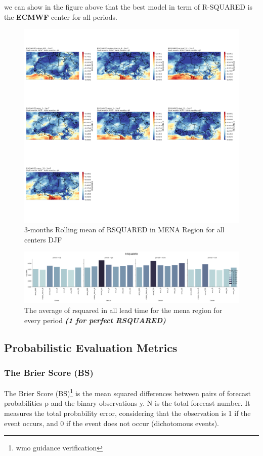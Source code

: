 we can show in the figure above that the best model in term of R-SQUARED is the \textbf{ECMWF} center for all periods.

\begin{figure}[H]
\includegraphics[scale=0.3]{RSQUARED_DJF.png}
\caption{3-months Rolling mean of RSQUARED in MENA Region for all centers DJF}
\end{figure}


\begin{figure}[H]
	\centering
	\includegraphics[scale=0.3]{rsquared.png}
	\caption{The average of rsquared in all lead time for the mena region for every period \textbf{\textit{(1 for perfect RSQUARED)} }}

\end{figure}



\subsection{Probabilistic Evaluation Metrics}

\subsubsection{The Brier Score (BS)}
The Brier Score (BS)\footnote{wmo guidance verification} is the mean squared differences between pairs of forecast probabilities p and the binary observations y. N is the total forecast number. It measures the total probability error, considering that the observation is 1 if the event occurs, and 0 if the event does not occur (dichotomous events).

